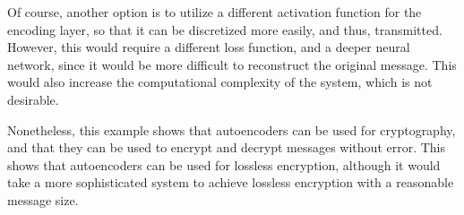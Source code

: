 Of course, another option is to utilize a different activation function for the encoding layer, so that it can be discretized more easily, and thus, transmitted. However, this would require a different loss function, and a deeper neural network, since it would be more difficult to reconstruct the original message. This would also increase the computational complexity of the system, which is not desirable.

Nonetheless, this example shows that autoencoders can be used for cryptography, and that they can be used to encrypt and decrypt messages without error. This shows that autoencoders can be used for lossless encryption, although it would take a more sophisticated system to achieve lossless encryption with a reasonable message size.

